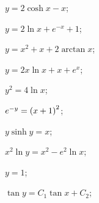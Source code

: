 \begin{enumsols}
		\label{sol:bvp_bvp:linear_hard}
		\item \( y = 2 \cosh{x} - x \); \sfill %
		\item \( y = 2 \ln{x} + e^{- x} + 1 \); \sfill %
		\item \( y = x^2 + x + 2 \arctan{x} \); \sfill %
		\item \( y = 2 x \ln{x} + x + e^{x} \); \sfill %

		\label{sol:bvp_bvp:nonlinear}
		\item \( y^2 = 4 \ln{x} \); \sfill %
		\item \( e^{- y} = \left( x + 1 \right)^2 \); \sfill %
		\item \( y \sinh{y} = x \); \sfill %
		\item \( x^2 \ln{y} = x^2 -  e^2 \ln{x} \); \sfill %
		\item \( y = 1  \); \sfill %
		\item \( \tan{y} = C_1 \tan{x} + C_2 \); \sfill %
		

\end{enumsols}
